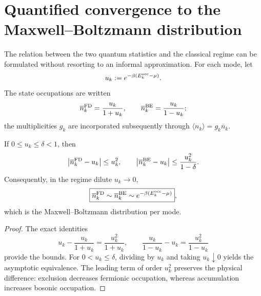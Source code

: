 \clearpage
\section{Quantified convergence to the Maxwell--Boltzmann distribution}
\label{v:v:rec:ocupacion:section:03}

The relation between the two quantum statistics and the classical regime can
be formulated without resorting to an informal approximation. For each mode, let
\[
 u_k:=e^{-\beta(E_k^{\rm occ}-\mu)}.
\]
The state occupations are written
\[
 \overline n_k^{\rm FD}=\frac{u_k}{1+u_k},
 \qquad
 \overline n_k^{\rm BE}=\frac{u_k}{1-u_k};
\]
the multiplicities \(g_k\) are incorporated subsequently through
\(\langle n_k\rangle=g_k\overline n_k\).

\begin{theorem}
\label{v:v:rec:thm:limite-clasico-fd-be-rev2}
If \(0\leq u_k\leq\delta<1\), then
\[
 \left|\overline n_k^{\rm FD}-u_k\right|\leq u_k^2,
 \qquad
 \left|\overline n_k^{\rm BE}-u_k\right|
 \leq\frac{u_k^2}{1-\delta}.
\]
Consequently, in the regime dilute \(u_k\to0\),
\[
 \boxed{
 \overline n_k^{\rm FD}\sim
 \overline n_k^{\rm BE}\sim
 e^{-\beta(E_k^{\rm occ}-\mu)}} ,
\]
which is the Maxwell--Boltzmann distribution per mode.
\end{theorem}

\begin{proof}
The exact identities
\[
 u_k-\frac{u_k}{1+u_k}=\frac{u_k^2}{1+u_k},
 \qquad
 \frac{u_k}{1-u_k}-u_k=\frac{u_k^2}{1-u_k}
\]
provide the bounds. For \(0<u_k\leq\delta\), dividing by \(u_k\) and
taking \(u_k\downarrow0\) yields
the asymptotic equivalence. The leading term of order \(u_k^2\) preserves the
physical difference: exclusion decreases fermionic occupation, whereas
accumulation increases bosonic occupation.
\end{proof}
